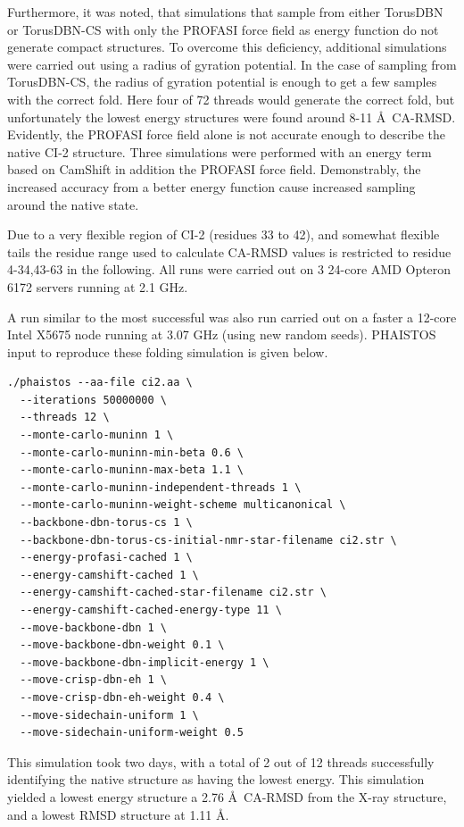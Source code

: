 Furthermore, it was noted, that simulations that sample from either TorusDBN or TorusDBN-CS with only the PROFASI force field as energy function do not generate compact structures.
To overcome this deficiency, additional simulations were carried out using a radius of gyration potential.
In the case of sampling from TorusDBN-CS, the radius of gyration potential is enough to get a few samples with the correct fold. Here four of 72 threads would generate the correct fold, but unfortunately the lowest energy structures were found around 8-11 \AA\ CA-RMSD. Evidently, the PROFASI force field alone is not accurate enough to describe the native CI-2 structure.
Three simulations were performed with an energy term based on CamShift in addition the PROFASI force field.
Demonstrably, the increased accuracy from a better energy function cause increased sampling around the native state.

Due to a very flexible region of CI-2 (residues 33 to 42), and somewhat flexible tails the residue range used to calculate CA-RMSD values is restricted to residue 4-34,43-63 in the following.
All runs were carried out on 3 24-core AMD Opteron 6172 servers running at 2.1 GHz. 

A run similar to the most successful was also run carried out on a faster a 12-core Intel X5675 node running at 3.07 GHz (using new random seeds).
PHAISTOS input to reproduce these folding simulation is given below.

\begin{lstlisting}
./phaistos --aa-file ci2.aa \
  --iterations 50000000 \
  --threads 12 \
  --monte-carlo-muninn 1 \
  --monte-carlo-muninn-min-beta 0.6 \
  --monte-carlo-muninn-max-beta 1.1 \
  --monte-carlo-muninn-independent-threads 1 \
  --monte-carlo-muninn-weight-scheme multicanonical \
  --backbone-dbn-torus-cs 1 \
  --backbone-dbn-torus-cs-initial-nmr-star-filename ci2.str \
  --energy-profasi-cached 1 \
  --energy-camshift-cached 1 \
  --energy-camshift-cached-star-filename ci2.str \
  --energy-camshift-cached-energy-type 11 \
  --move-backbone-dbn 1 \
  --move-backbone-dbn-weight 0.1 \
  --move-backbone-dbn-implicit-energy 1 \
  --move-crisp-dbn-eh 1 \
  --move-crisp-dbn-eh-weight 0.4 \
  --move-sidechain-uniform 1 \
  --move-sidechain-uniform-weight 0.5
\end{lstlisting}

This simulation took two days, with a total of 2 out of 12 threads successfully identifying the native structure as having the lowest energy.
This simulation yielded a lowest energy structure a 2.76 \AA~CA-RMSD from the X-ray structure, and a lowest RMSD structure at 1.11 \AA.

